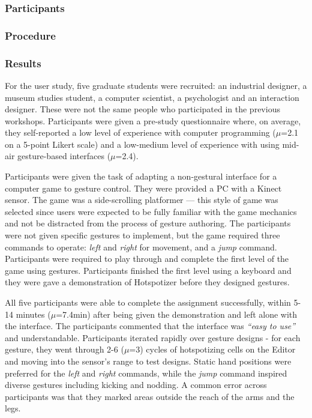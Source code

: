 \subsubsection{Participants}

\subsubsection{Procedure}

\subsubsection{Results}


For the user study, five graduate students were recruited: an industrial designer, a museum studies student, a computer scientist, a psychologist and an interaction designer. These were not the same people who participated in the previous workshops. Participants were given a pre-study questionnaire where, on average, they self-reported a low level of experience with computer programming ($\mu$=2.1 on a 5-point Likert scale) and a low-medium level of experience with using mid-air gesture-based interfaces ($\mu$=2.4).

Participants were given the task of adapting a non-gestural interface for a computer game to gesture control. They were provided a PC with a Kinect sensor. The game was a side-scrolling platformer --- this style of game was selected since users were expected to be fully familiar with the game mechanics and not be distracted from the process of gesture authoring. The participants were not given specific gestures to implement, but the game required three commands to operate: \emph{left} and \emph{right} for movement, and a \emph{jump} command. Participants were required to play through and complete the first level of the game using gestures. Participants finished the first level using a keyboard and they were gave a demonstration of Hotspotizer before they designed gestures.

All five participants were able to complete the assignment successfully, within 5-14 minutes ($\mu$=7.4min) after being given the demonstration and left alone with the interface. The participants commented that the interface was \emph{“easy to use”} and understandable. Participants iterated rapidly over gesture designs - for each gesture, they went through 2-6 ($\mu$=3) cycles of hotspotizing cells on the Editor and moving into the sensor’s range to test designs. Static hand positions were preferred for the \emph{left} and \emph{right} commands, while the \emph{jump} command inspired diverse gestures including kicking and nodding. A common error across participants was that they marked areas outside the reach of the arms and the legs.

